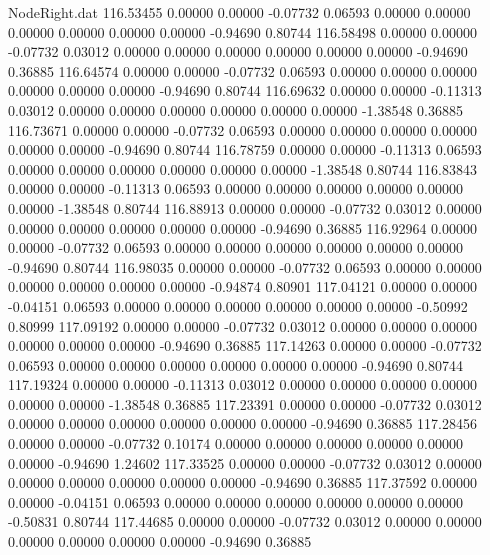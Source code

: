 \begin{filecontents}{NodeRight.dat}
 116.53455    0.00000    0.00000    -0.07732    0.06593    0.00000    0.00000    0.00000    0.00000    0.00000    0.00000   -0.94690    0.80744
 116.58498    0.00000    0.00000    -0.07732    0.03012    0.00000    0.00000    0.00000    0.00000    0.00000    0.00000   -0.94690    0.36885
 116.64574    0.00000    0.00000    -0.07732    0.06593    0.00000    0.00000    0.00000    0.00000    0.00000    0.00000   -0.94690    0.80744
 116.69632    0.00000    0.00000    -0.11313    0.03012    0.00000    0.00000    0.00000    0.00000    0.00000    0.00000   -1.38548    0.36885
 116.73671    0.00000    0.00000    -0.07732    0.06593    0.00000    0.00000    0.00000    0.00000    0.00000    0.00000   -0.94690    0.80744
 116.78759    0.00000    0.00000    -0.11313    0.06593    0.00000    0.00000    0.00000    0.00000    0.00000    0.00000   -1.38548    0.80744
 116.83843    0.00000    0.00000    -0.11313    0.06593    0.00000    0.00000    0.00000    0.00000    0.00000    0.00000   -1.38548    0.80744
 116.88913    0.00000    0.00000    -0.07732    0.03012    0.00000    0.00000    0.00000    0.00000    0.00000    0.00000   -0.94690    0.36885
 116.92964    0.00000    0.00000    -0.07732    0.06593    0.00000    0.00000    0.00000    0.00000    0.00000    0.00000   -0.94690    0.80744
 116.98035    0.00000    0.00000    -0.07732    0.06593    0.00000    0.00000    0.00000    0.00000    0.00000    0.00000   -0.94874    0.80901
 117.04121    0.00000    0.00000    -0.04151    0.06593    0.00000    0.00000    0.00000    0.00000    0.00000    0.00000   -0.50992    0.80999
 117.09192    0.00000    0.00000    -0.07732    0.03012    0.00000    0.00000    0.00000    0.00000    0.00000    0.00000   -0.94690    0.36885
 117.14263    0.00000    0.00000    -0.07732    0.06593    0.00000    0.00000    0.00000    0.00000    0.00000    0.00000   -0.94690    0.80744
 117.19324    0.00000    0.00000    -0.11313    0.03012    0.00000    0.00000    0.00000    0.00000    0.00000    0.00000   -1.38548    0.36885
 117.23391    0.00000    0.00000    -0.07732    0.03012    0.00000    0.00000    0.00000    0.00000    0.00000    0.00000   -0.94690    0.36885
 117.28456    0.00000    0.00000    -0.07732    0.10174    0.00000    0.00000    0.00000    0.00000    0.00000    0.00000   -0.94690    1.24602
 117.33525    0.00000    0.00000    -0.07732    0.03012    0.00000    0.00000    0.00000    0.00000    0.00000    0.00000   -0.94690    0.36885
 117.37592    0.00000    0.00000    -0.04151    0.06593    0.00000    0.00000    0.00000    0.00000    0.00000    0.00000   -0.50831    0.80744
 117.44685    0.00000    0.00000    -0.07732    0.03012    0.00000    0.00000    0.00000    0.00000    0.00000    0.00000   -0.94690    0.36885

\end{filecontents}
